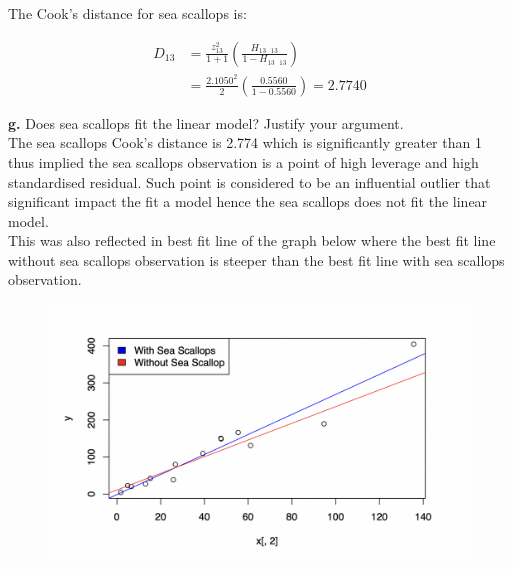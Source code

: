 \documentclass[12 pt, a4paper]{article}
\begin{document}
\noindent The Cook's distance for sea scallops is:

\begin{align*}
D_{13}&=\frac{z_{13}^2}{1+1} \left( \frac{H_{13 \text{ } 13}}{1-H_{13 \text{ } 13}} \right) \\
& = \frac{2.1050^2}{2} \left(  \frac{0.5560}{1- 0.5560} \right) =2.7740
\end{align*}

\noindent \textbf{g.} Does sea scallops fit the linear model? Justify your argument.\\

\noindent The sea scallops Cook's distance is 2.774 which is significantly greater than 1 thus implied the sea scallops observation is a point of high leverage and high standardised residual.  Such point is considered to be an influential outlier that significant impact the fit a model hence the sea scallops does not fit the linear model.  \\

\noindent This was also reflected in best fit line of the graph below where the best fit line without sea scallops observation is steeper than the best fit line with sea scallops observation.

\begin{figure}[h]
\includegraphics[scale =0.3]{graph00}
\end{figure}
\end{document}
